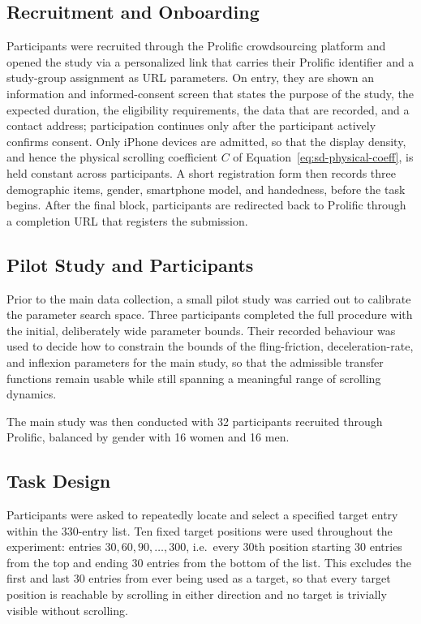 \subsection{Recruitment and Onboarding}

Participants were recruited through the Prolific crowdsourcing platform and opened the study via a personalized link that carries their Prolific identifier and a study-group assignment as URL parameters. On entry, they are shown an information and informed-consent screen that states the purpose of the study, the expected duration, the eligibility requirements, the data that are recorded, and a contact address; participation continues only after the participant actively confirms consent. Only iPhone devices are admitted, so that the display density, and hence the physical scrolling coefficient $C$ of Equation~\eqref{eq:sd-physical-coeff}, is held constant across participants. A short registration form then records three demographic items, gender, smartphone model, and handedness, before the task begins. After the final block, participants are redirected back to Prolific through a completion URL that registers the submission.

\subsection{Pilot Study and Participants}

Prior to the main data collection, a small pilot study was carried out to calibrate the parameter search space. Three participants completed the full procedure with the initial, deliberately wide parameter bounds. Their recorded behaviour was used to decide how to constrain the bounds of the fling-friction, deceleration-rate, and inflexion parameters for the main study, so that the admissible transfer functions remain usable while still spanning a meaningful range of scrolling dynamics.

The main study was then conducted with 32 participants recruited through Prolific, balanced by gender with 16 women and 16 men.

\subsection{Task Design}
\label{sec:task}

Participants were asked to repeatedly locate and select a specified target entry within the 330-entry list. Ten fixed target positions were used throughout the experiment: entries $30, 60, 90, \dots, 300$, i.e.\ every 30th position starting 30 entries from the top and ending 30 entries from the bottom of the list. This excludes the first and last 30 entries from ever being used as a target, so that every target position is reachable by scrolling in either direction and no target is trivially visible without scrolling.

